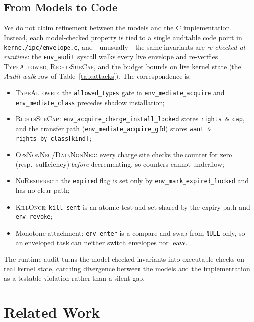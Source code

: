 \documentclass[letterpaper,twocolumn,10pt]{article}
\begin{document}
\subsection{From Models to Code}
\label{sec:trace}

We do not claim refinement between the models and the C implementation.
Instead, each model-checked property is tied to a single auditable code
point in \texttt{kernel/ipc/envelope.c}, and---unusually---the same
invariants are \emph{re-checked at runtime}: the \texttt{env\_audit}
syscall walks every live envelope and re-verifies
\textsc{TypeAllowed}, \textsc{RightsSubCap}, and the budget bounds on
live kernel state (the \emph{Audit walk} row of
Table~\ref{tab:attacks}).  The correspondence is:

\begin{itemize}
\item \textsc{TypeAllowed}: the \texttt{allowed\_types} gate in
      \texttt{env\_mediate\_acquire} and \texttt{env\_mediate\_class}
      precedes shadow installation;
\item \textsc{RightsSubCap}: \texttt{env\_acquire\_charge\_install\_locked}
      stores \texttt{rights \& cap}, and the transfer path
      (\texttt{env\_mediate\_acquire\_gfd}) stores
      \texttt{want \& rights\_by\_class[kind]};
\item \textsc{OpsNonNeg}/\textsc{DataNonNeg}: every charge site checks
      the counter for zero (resp.~sufficiency) \emph{before}
      decrementing, so counters cannot underflow;
\item \textsc{NoResurrect}: the \texttt{expired} flag is set only by
      \texttt{env\_mark\_expired\_locked} and has no clear path;
\item \textsc{KillOnce}: \texttt{kill\_sent} is an atomic test-and-set
      shared by the expiry path and \texttt{env\_revoke};
\item Monotone attachment: \texttt{env\_enter} is a compare-and-swap
      from \texttt{NULL} only, so an enveloped task can neither switch
      envelopes nor leave.
\end{itemize}

The runtime audit turns the model-checked invariants into executable
checks on real kernel state, catching divergence between the models and
the implementation as a testable violation rather than a silent gap.

\section{Related Work}
\label{sec:related}
\end{document}
